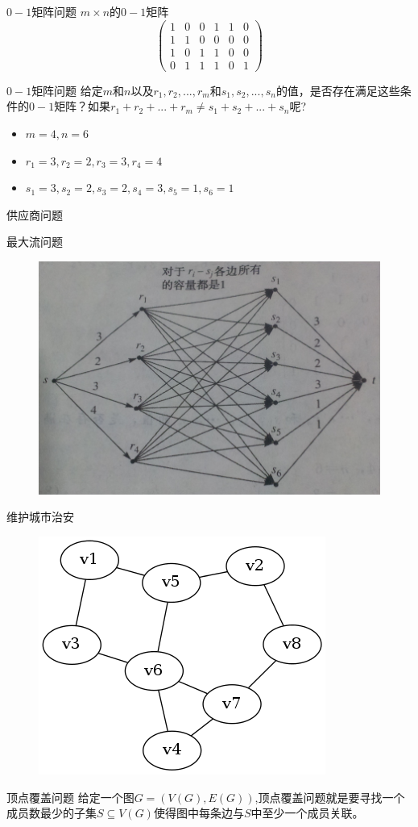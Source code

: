 \documentclass[UTF8]{ctexbeamer}
\begin{document}
\begin{frame}{$0-1$矩阵问题}
  $m \times n$的$0-1$矩阵
  \[
  \left(\begin{array}{cccccc}
    1 & 0 & 0 & 1 & 1 & 0\\
    1 & 1 & 0 & 0 & 0 & 0\\
    1 & 0 & 1 & 1 & 0 & 0\\
    0 & 1 & 1 & 1 & 0 & 1
  \end{array}\right)
  \]
  \begin{block}{$0-1$矩阵问题}
    给定$m$和$n$以及$r_1, r_2,...,r_m$和$s_1, s_2, ..., s_n$的值，是否存在满足这些条件的$0-1$矩阵？如果$r_1+r_2+...+r_m \neq s_1 + s_2 +...+s_n$呢?
  \end{block}

  \begin{itemize}
  \item $m=4, n=6$
  \item $r_1=3, r_2=2, r_3=3, r_4=4$
  \item $s_1=3, s_2=2, s_3=2, s_4=3, s_5=1, s_6=1$
  \end{itemize}
\end{frame}

\begin{frame}{供应商问题}

  最大流问题

  \begin{figure}
    \centering
    \includegraphics[width=.6\textwidth]{maxflow.png}
  \end{figure}
\end{frame}

\begin{frame}{维护城市治安}
  \begin{figure}
    \centering
    \includegraphics[width=.4\textwidth]{vertexcover.png}
  \end{figure}

  \begin{block}{顶点覆盖问题}
    给定一个图$G=(V(G), E(G))$,顶点覆盖问题就是要寻找一个成员数最少的子集$S \subseteq V(G)$使得图中每条边与$S$中至少一个成员关联。
  \end{block}
  
\end{frame}
\end{document}
